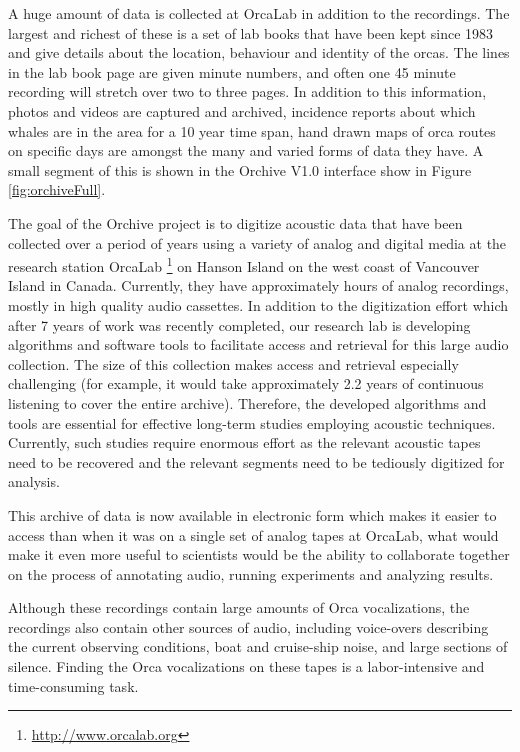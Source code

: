 A huge amount of data is collected at OrcaLab in addition to the
recordings.  The largest and richest of these is a set of lab books
that have been kept since 1983 and give details about the location,
behaviour and identity of the orcas.  The lines in the lab book page
are given minute numbers, and often one 45 minute recording will
stretch over two to three pages.  In addition to this information,
photos and videos are captured and archived, incidence reports about
which whales are in the area for a 10 year time span, hand drawn maps
of orca routes on specific days are amongst the many and varied forms
of data they have.  A small segment of this is shown in the Orchive
V1.0 interface show in Figure \ref{fig:orchiveFull}.

The goal of the Orchive project is to digitize acoustic data that have
been collected over a period of \totalYearsOrcaLabCollecting years
using a variety of analog and digital media at the research station
OrcaLab \footnote{\url{http://www.orcalab.org}} on Hanson Island on
the west coast of Vancouver Island in Canada.  Currently, they have
approximately \aboutHoursOfOrchiveRecordings hours of analog
recordings, mostly in high quality audio cassettes. In addition to the
digitization effort which after 7 years of work was recently
completed, our research lab is developing algorithms and software
tools to facilitate access and retrieval for this large audio
collection.  The size of this collection makes access and retrieval
especially challenging (for example, it would take approximately 2.2
years of continuous listening to cover the entire archive).
Therefore, the developed algorithms and tools are essential for
effective long-term studies employing acoustic techniques. Currently,
such studies require enormous effort as the relevant acoustic tapes
need to be recovered and the relevant segments need to be tediously
digitized for analysis.

This archive of data is now available in electronic form which makes
it easier to access than when it was on a single set of analog tapes
at OrcaLab, what would make it even more useful to scientists would be
the ability to collaborate together on the process of annotating
audio, running experiments and analyzing results.

Although these recordings contain large amounts of Orca vocalizations,
the recordings also contain other sources of audio, including
voice-overs describing the current observing conditions, boat and
cruise-ship noise, and large sections of silence.  Finding the Orca
vocalizations on these tapes is a labor-intensive and time-consuming
task.

